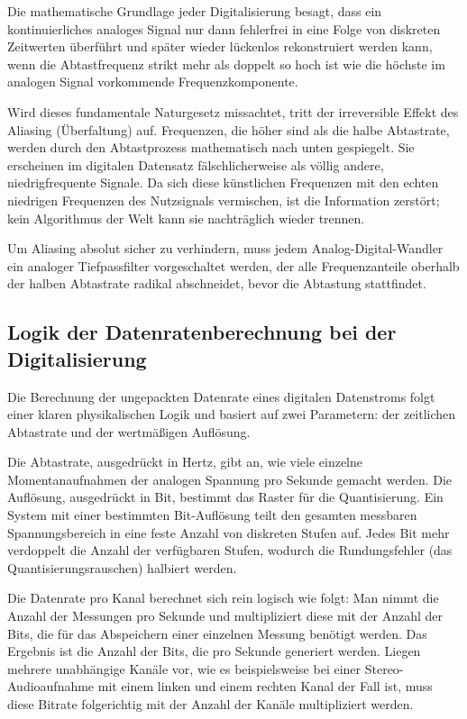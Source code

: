 \documentclass[11pt,a4paper]{article}
\begin{document}
Die mathematische Grundlage jeder Digitalisierung besagt, dass ein kontinuierliches analoges Signal nur dann fehlerfrei in eine Folge von diskreten Zeitwerten überführt und später wieder lückenlos rekonstruiert werden kann, wenn die Abtastfrequenz strikt mehr als doppelt so hoch ist wie die höchste im analogen Signal vorkommende Frequenzkomponente.

Wird dieses fundamentale Naturgesetz missachtet, tritt der irreversible Effekt des Aliasing (Überfaltung) auf. Frequenzen, die höher sind als die halbe Abtastrate, werden durch den Abtastprozess mathematisch nach unten gespiegelt. Sie erscheinen im digitalen Datensatz fälschlicherweise als völlig andere, niedrigfrequente Signale. Da sich diese künstlichen Frequenzen mit den echten niedrigen Frequenzen des Nutzsignals vermischen, ist die Information zerstört; kein Algorithmus der Welt kann sie nachträglich wieder trennen. 

Um Aliasing absolut sicher zu verhindern, muss jedem Analog-Digital-Wandler ein analoger Tiefpassfilter vorgeschaltet werden, der alle Frequenzanteile oberhalb der halben Abtastrate radikal abschneidet, bevor die Abtastung stattfindet.

\subsection{Logik der Datenratenberechnung bei der Digitalisierung}

Die Berechnung der ungepackten Datenrate eines digitalen Datenstroms folgt einer klaren physikalischen Logik und basiert auf zwei Parametern: der zeitlichen Abtastrate und der wertmäßigen Auflösung.

Die Abtastrate, ausgedrückt in Hertz, gibt an, wie viele einzelne Momentanaufnahmen der analogen Spannung pro Sekunde gemacht werden. Die Auflösung, ausgedrückt in Bit, bestimmt das Raster für die Quantisierung. Ein System mit einer bestimmten Bit-Auflösung teilt den gesamten messbaren Spannungsbereich in eine feste Anzahl von diskreten Stufen auf. Jedes Bit mehr verdoppelt die Anzahl der verfügbaren Stufen, wodurch die Rundungsfehler (das Quantisierungsrauschen) halbiert werden.

Die Datenrate pro Kanal berechnet sich rein logisch wie folgt: Man nimmt die Anzahl der Messungen pro Sekunde und multipliziert diese mit der Anzahl der Bits, die für das Abspeichern einer einzelnen Messung benötigt werden. Das Ergebnis ist die Anzahl der Bits, die pro Sekunde generiert werden. Liegen mehrere unabhängige Kanäle vor, wie es beispielsweise bei einer Stereo-Audioaufnahme mit einem linken und einem rechten Kanal der Fall ist, muss diese Bitrate folgerichtig mit der Anzahl der Kanäle multipliziert werden.
\end{document}
